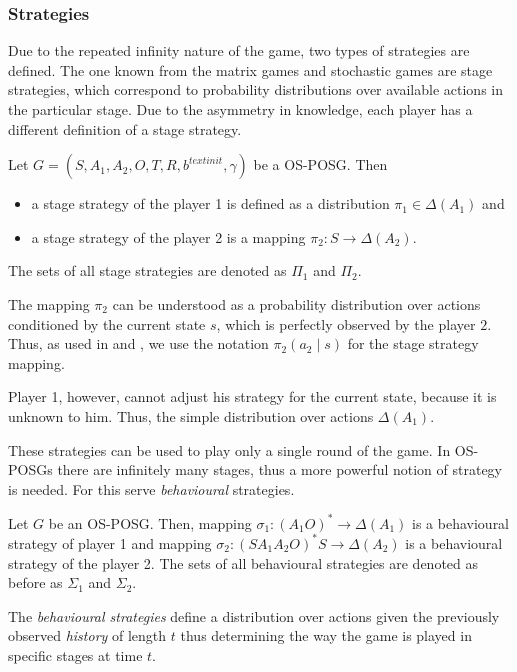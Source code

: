 \documentclass[../main.tex]{subfiles}
\begin{document}
\subsubsection{Strategies}\label{bg:osposg:model:strat}
Due to the repeated infinity nature of the game, two types of strategies are defined.
The one known from the matrix games and stochastic games are stage strategies, which correspond to probability distributions over available actions in the particular stage.
Due to the asymmetry in knowledge, each player has a different definition of a stage strategy.
\begin{definition}
    Let $G = \left(S, A_1, A_2, O, T, R, b^{text{init}}, \gamma\right)$ be a OS-POSG.
    Then 
    \begin{itemize}
        \item a stage strategy of the player 1 is defined as a distribution $\pi_1 \in \Delta(A_1)$ and
        \item a stage strategy of the player 2 is a mapping $\pi_2 : S \to \Delta(A_2)$.
    \end{itemize}
    The sets of all stage strategies are denoted as $\Pi_1$ and $\Pi_2$.
\end{definition}
The mapping $\pi_2$ can be understood as a probability distribution over actions conditioned by the current state $s$, which is perfectly observed by the player $2$.
Thus, as used in \cite{osposgs} and \cite{poposgsthesis}, we use the notation $\pi_2(a_2 \mid s)$ for the stage strategy mapping.

Player 1, however, cannot adjust his strategy for the current state, because it is unknown to him.
Thus, the simple distribution over actions $\Delta(A_1)$.

These strategies can be used to play only a single round of the game.
In OS-POSGs there are infinitely many stages, thus a more powerful notion of strategy is needed.
For this serve \textit{behavioural} strategies.
\begin{definition}
    Let $G$ be an OS-POSG.
    Then, mapping $\sigma_1 : \left(A_1O\right)^* \to \Delta(A_1)$ is a behavioural strategy of player 1 and mapping $\sigma_2 : \left(SA_1A_2O\right)^*S \to \Delta(A_2)$ is a behavioural strategy of the player 2.
    The sets of all behavioural strategies are denoted as before as $\Sigma_1$ and $\Sigma_2$.
\end{definition}
The \textit{behavioural strategies} define a distribution over actions given the previously observed \textit{history} of length $t$ thus determining the way the game is played in specific stages at time $t$.
\end{document}
